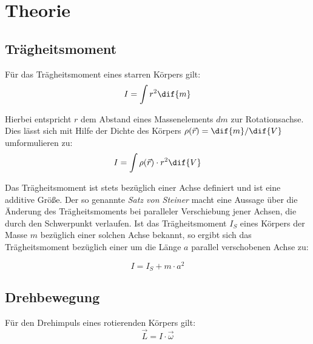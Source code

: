 \section{Theorie}

\subsection{Trägheitsmoment}
Für das Trägheitsmoment eines starren Körpers gilt:
\begin{equation}
   I = \int r^2 \dif{m}
\end{equation}

Hierbei entspricht $r$ dem Abstand eines Massenelements $dm$ zur Rotationsachse. Dies
lässt sich mit Hilfe der Dichte des Körpers $\rho(\vec{r}) = \dif{m}/\dif{V}$ umformulieren zu:
\begin{equation}
  I = \int \rho(\vec{r})\cdot r^2 \dif{V}
\end{equation}

Das Trägheitsmoment ist stets bezüglich einer Achse definiert und ist eine
additive Größe. Der so genannte \textit{Satz von Steiner} macht eine Aussage über die Änderung des Trägheitsmoments
bei paralleler Verschiebung jener Achsen, die durch den Schwerpunkt verlaufen. Ist das
Trägheitsmoment $I_S$ eines Körpers der Masse $m$ bezüglich einer solchen Achse bekannt, so ergibt sich das
Trägheitsmoment bezüglich einer um die Länge $a$ parallel verschobenen Achse zu:

\begin{equation}
    I = I_S + m \cdot a^2
    \label{eq: steiner}
\end{equation}

\subsection{Drehbewegung}
Für den Drehimpuls eines rotierenden Körpers gilt:
\begin{equation}
 \vec{L} = I \cdot \vec{\omega}
\end{equation}

